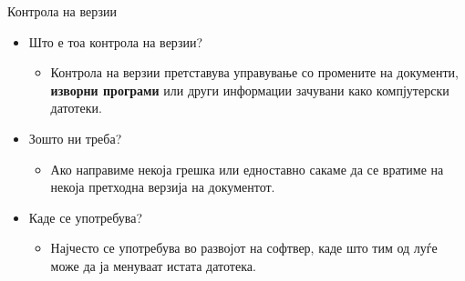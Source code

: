 \begin{frame}{Контрола на верзии}
\begin{itemize}
\item Што е тоа контрола на верзии?
    \begin{itemize}
    \item Контрола на верзии претставува управување со промените на документи,
    \textbf{изворни програми} или други информации зачувани како компјутерски датотеки.
    \end{itemize}
\item Зошто ни треба?
    \begin{itemize}
    \item Ако направиме некоја грешка или едноставно сакаме да се
    вратиме на некоја претходна верзија на документот.
    \end{itemize}
\item Каде се употребува?
    \begin{itemize}
    \item Најчесто се употребува во развојот на софтвер, каде што тим од луѓе може да ја менуваат истата датотека.
    \end{itemize}
\end{itemize}
\end{frame}

